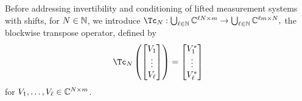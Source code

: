 
Before addressing invertibility and conditioning of lifted measurement systems with shifts, for $N \in \mathbb{N}$, we introduce $\Tc_N : \bigcup_{\ell \in \N} \C^{\ell N \times m} \to \bigcup_{\ell \in \N} \C^{\ell m \times N},$ the blockwise transpose operator, defined by \[\Tc_N\left(\begin{bmatrix} V_1 \\ \vdots \\ V_\ell \end{bmatrix}\right) = \begin{bmatrix} V_1^* \\ \vdots \\ V_{\ell}^* \end{bmatrix}\] for $V_1, \ldots, V_\ell \in \mathbb{C}^{N \times m}$.

